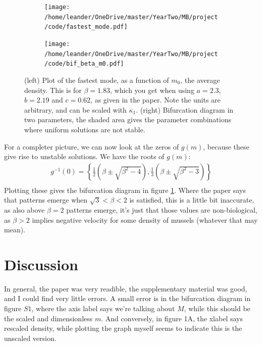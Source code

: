 \documentclass[a4paper]{jpconf}
\begin{document}
\begin{figure}[h!]
    \centering
    \begin{subfigure}[t]{0.5\textwidth}\centering
        \texttt{[image: /home/leander/OneDrive/master/YearTwo/MB/project/code/fastest\_mode.pdf]}
    \end{subfigure}\hfill
    \begin{subfigure}[t]{0.5\textwidth}\centering
        \texttt{[image: /home/leander/OneDrive/master/YearTwo/MB/project/code/bif\_beta\_m0.pdf]}
        
    \end{subfigure}
    \caption{(left) Plot of the fastest mode, as a function of $m_0$, the average density. This is for $\beta=1.83$, which you get when using $a=  2.3$, $b = 2.19$ and $c = 0.62$, as given in the paper. Note the units are arbitrary, and can be scaled with $\kappa_1$. (right) Bifurcation diagram in two parameters, the shaded area gives the parameter combinations where uniform solutions are not stable.}\label{bif_beta_m0}
\end{figure}

For a completer picture, we can now look at the zeros of $g(m)$, because these give rise to unstable solutions. We have the roots of $g(m)$:
\[
\begin{aligned}
g^{-1}(0) =  \left\{\frac{1}{2}\left(\beta \pm \sqrt{\beta^2 - 4}\right) ,\frac{1}{3}\left(\beta \pm \sqrt{\beta^2 - 3}\right)\right\} \\
\end{aligned}
\]
Plotting these gives the bifurcation diagram in figure \ref{bif_beta_m0}.
Where the paper says that patterns emerge when $\sqrt 3<\beta<2$ is satisfied, this is a little bit inaccurate, as also above $\beta=2$ patterns emerge, it's just that those values are non-biological, as $\beta>2$ implies negative velocity for some density of mussels (whatever that may mean). 

\section{Discussion}
In general, the paper was very readible, the supplementary material was good, and I could find very little errors. A small error is in the bifurcation diagram in figure $S1$, where the axis label says we're talking about $M$, while this should be the scaled and dimensionless $m$. And conversely, in figure 1A, the xlabel says rescaled density, while plotting the graph myself seems to indicate this is the unscaled version.
\end{document}
